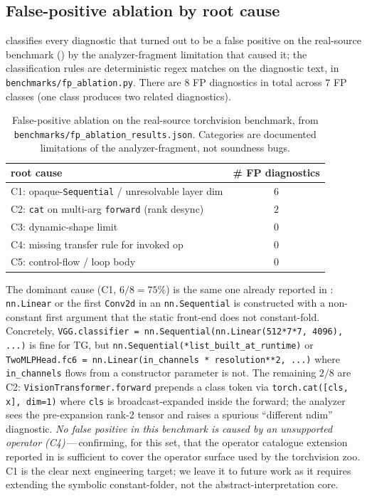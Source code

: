 \documentclass{article}
\theoremstyle{definition}
\begin{document}
\subsection{False-positive ablation by root cause}
\label{sec:fp-ablation}

 classifies every diagnostic that turned out
to be a false positive on the real-source benchmark
() by the analyzer-fragment limitation that
caused it; the classification rules are deterministic regex
matches on the diagnostic text, in
\verb|benchmarks/fp_ablation.py|. There are $8$ FP diagnostics in
total across $7$ FP classes (one class produces two related
diagnostics).

\begin{table}[t]
\centering\small
\caption{False-positive ablation on the real-source torchvision
benchmark, from
\texttt{benchmarks/fp\_ablation\_results.json}. Categories are
documented limitations of the analyzer-fragment, not soundness
bugs.}
\label{tab:fp-ablation}
\begin{tabular}{lc}
\toprule
root cause & \# FP diagnostics \\
\midrule
C1: opaque-\texttt{Sequential} / unresolvable layer dim & $6$ \\
C2: \texttt{cat} on multi-arg \texttt{forward} (rank desync)            & $2$ \\
C3: dynamic-shape limit                                  & $0$ \\
C4: missing transfer rule for invoked op                 & $0$ \\
C5: control-flow / loop body                             & $0$ \\
\bottomrule
\end{tabular}
\end{table}

The dominant cause (C1, $6/8 = 75\%$) is the same one already
reported in : \texttt{nn.Linear} or the first
\texttt{Conv2d} in an \texttt{nn.Sequential} is constructed with a
non-constant first argument that the static front-end does not
constant-fold. Concretely, \verb|VGG.classifier = nn.Sequential(nn.Linear(512*7*7, 4096), ...)|
is fine for TG, but \verb|nn.Sequential(*list_built_at_runtime)|
or \verb|TwoMLPHead.fc6 = nn.Linear(in_channels * resolution**2, ...)|
where \verb|in_channels| flows from a constructor parameter is not.
The remaining $2/8$ are C2: \verb|VisionTransformer.forward|
prepends a class token via \verb|torch.cat([cls, x], dim=1)| where
\verb|cls| is broadcast-expanded inside the forward; the analyzer
sees the pre-expansion rank-2 tensor and raises a spurious
``different ndim'' diagnostic. \emph{No false positive in this
benchmark is caused by an unsupported operator
(C4)}\,---\,confirming, for this set, that the operator catalogue
extension reported in  is sufficient to
cover the operator surface used by the torchvision zoo. C1 is the
clear next engineering target; we leave it to future work as it
requires extending the symbolic constant-folder, not the
abstract-interpretation core.
\end{document}
